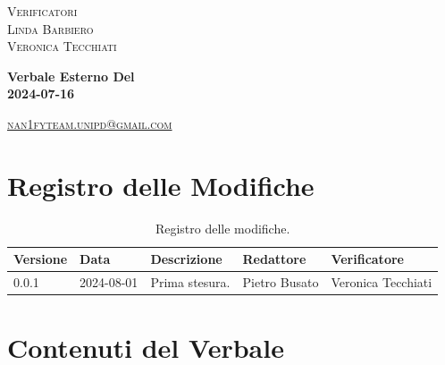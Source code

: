 \documentclass[8pt]{article}
\begin{document}
\begin{titlepage}
\begin{minipage}[t]{0.47\textwidth}
		{\large{\textsc{Verificatori}}
			\vspace{3mm}
			{\\\large{\textsc{Linda Barbiero}\\}} %
			{\large{\textsc{Veronica Tecchiati}}}
			
		}
		\vspace{4mm}\vspace{4mm}
	\end{minipage}
	\vspace{4cm}
	\begin{center}
		\begin{flushright}
			{\fontsize{30pt}{52pt}\selectfont \textbf{Verbale Esterno Del\\2024-07-16\\}} %
		\end{flushright}
		\vspace{3cm}
	\end{center}
	\vspace{8.5 cm}
	{\small \textsc{\href{mailto: nan1fyteam.unipd@gmail.com}{nan1fyteam.unipd@gmail.com}}}
\end{titlepage}
\pagestyle{mystyle}
\section*{Registro delle Modifiche}
\begin{table}[ht!]	
	\centering
	\begin{tabular}{p{1.2cm} p{2cm} p{5cm} p{3cm} p{3cm}}
		\toprule
		\textbf{Versione}& \textbf{Data} & \textbf{Descrizione} & \textbf{Redattore} & \textbf{Verificatore} \\
		\midrule
		0.0.1 & 2024-08-01 & Prima stesura. & Pietro Busato & Veronica Tecchiati \\
		\bottomrule
	\end{tabular}
	\caption{Registro delle modifiche.}
	\label{table:Registro delle modifiche}
\end{table}
\newpage
\tableofcontents
\clearpage
\newpage
\justifying
\section{Contenuti del Verbale}
\end{document}
